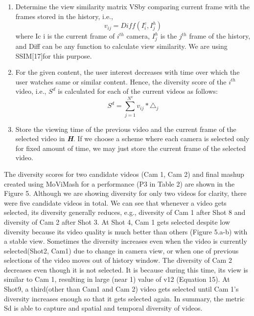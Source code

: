 \documentclass{sig-alternate}
\begin{document}
\begin{enumerate}
\item Determine the view similarity matrix VSby comparing current frame with the frames stored in the history, i.e.,
\begin{equation}
 v_{ij} = Diff(I^c_i ,I^h_j) 
\end{equation} where Ic i is the current frame of \(i^{th}\) camera, \(I^h_j\) is the \(j^{th}\) frame of the history, and Diff can be any function to calculate view similarity. We are using SSIM[17]for this purpose.
\item  For the given content, the user interest decreases with time over which the user watches same or similar content. Hence, the diversity score of the \(i^{th}\) video, i.e., \(S^d\) is calculated for each of the current videos as follows:
\begin{equation}
S^d = \sum_{j=1}^{N^v}v_{ij} * \triangle_j
\end{equation}
\item Store the viewing time of the previous video and the current frame of the selected video in \textbf{\textit{H}}. If we choose a scheme where each camera is selected only for fixed amount of time, we may just store the current frame of the selected video.
\end{enumerate}

The diversity scores for two candidate videos (Cam 1, Cam 2) and final mashup created using MoViMash for a performance (P3 in Table 2) are shown in the Figure 5. Although we are showing diversity for only two videos for clarity, there were ﬁve candidate videos in total. We can see that whenever a video gets selected, its diversity generally reduces, e.g., diversity of Cam 1 after Shot 8 and diversity of Cam 2 after Shot 3. At Shot 4, Cam 1 gets selected despite low diversity because its video quality is much better than others (Figure 5.a-b) with a stable view. Sometimes the diversity increases even when the video is currently selected(Shot2, Cam1) due to change in camera view, or when one of previous selections of the video moves out of history window. The diversity of Cam 2 decreases even though it is not selected. It is because during this time, its view is similar to Cam 1, resulting in large (near 1) value of v12 (Equation 15). At Shot9, a third(other than Cam1 and Cam 2) video gets selected until Cam 1's diversity increases enough so that it gets selected again. In summary, the metric Sd is able to capture and spatial and temporal diversity of videos. 
\end{document}
